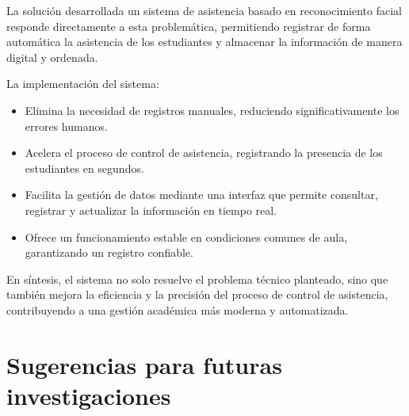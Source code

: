 La solución desarrollada un sistema de asistencia basado en reconocimiento facial responde directamente a esta problemática, permitiendo registrar de forma automática la asistencia de los estudiantes y almacenar la información de manera digital y ordenada.

La implementación del sistema:

\begin{itemize}
    \item Elimina la necesidad de registros manuales, reduciendo significativamente los errores humanos.  
    \item Acelera el proceso de control de asistencia, registrando la presencia de los estudiantes en segundos.  
    \item Facilita la gestión de datos mediante una interfaz que permite consultar, registrar y actualizar la información en tiempo real.  
    \item Ofrece un funcionamiento estable en condiciones comunes de aula, garantizando un registro confiable.  
\end{itemize}

En síntesis, el sistema no solo resuelve el problema técnico planteado, sino que también mejora la eficiencia y la precisión del proceso de control de asistencia, contribuyendo a una gestión académica más moderna y automatizada.


\section{Sugerencias para futuras investigaciones}

